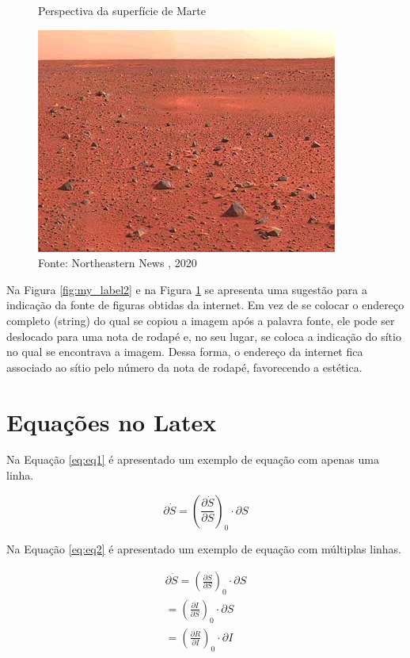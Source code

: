 \begin{figure}[h]
    \centering
    \caption{Perspectiva da superfície de Marte}
    \centering
    \includegraphics[width=.65\linewidth]{images/marte.jpg}
    \caption*{Fonte: Northeastern News \footnotemark , 2020}
    \label{fig:my_label3}
\end{figure}

Na Figura \ref{fig:my_label2}  e na Figura \ref{fig:my_label3} se apresenta uma sugestão para a indicação da fonte de figuras obtidas da internet. Em vez de se colocar o endereço completo (string) do qual se copiou a imagem após a palavra fonte, ele pode ser deslocado para uma nota de rodapé e, no seu lugar, se coloca a indicação do sítio no qual se encontrava a imagem. Dessa forma, o endereço da internet fica associado ao sítio pelo número da nota de rodapé, favorecendo a estética. 


\section{Equações no Latex}

Na Equação \ref{eq:eq1} é apresentado um exemplo de equação com apenas uma linha.

\begin{equation}
\label{eq:eq1}
        \partial \Dot{S} = \left( \frac{\partial \Dot{S} } {\partial S} \right)_0 \cdot \partial S 
\end{equation}

Na Equação \ref{eq:eq2} é apresentado um exemplo de equação com múltiplas linhas.

\begin{equation}
\label{eq:eq2}
    \begin{split}
        \partial \Dot{S} = \left( \frac{\partial \Dot{S} } {\partial S} \right)_0 \cdot \partial S \\
                         = \left( \frac{\partial \Dot{I} } {\partial S} \right)_0 \cdot \partial S \\
                         = \left( \frac{\partial \Dot{R} } {\partial I} \right)_0 \cdot \partial I
    \end{split}
\end{equation}

